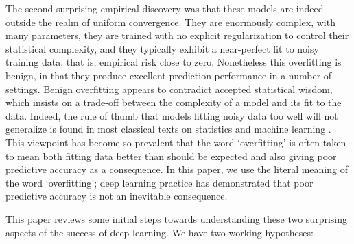 The second surprising empirical discovery was that these models are indeed outside the realm of uniform convergence. They are enormously complex, with many parameters, they are trained with no explicit regularization to control their statistical complexity, and they typically exhibit a near-perfect fit to noisy training data, that is, empirical risk close to zero. Nonetheless this overfitting is benign, in that they produce excellent prediction performance in a number of settings. Benign overfitting appears to contradict accepted statistical wisdom, which insists on a trade-off between the complexity of a model and its fit to the data. Indeed, the rule of thumb that models fitting noisy data too well will not generalize is found in most classical texts on statistics and machine learning \cite{friedman2001elements,wasserman2013all}.  This viewpoint has become so prevalent that the word `overfitting' is often taken to mean both fitting data better than should be expected and also giving poor predictive accuracy as a consequence. In this paper, we use the literal meaning of the word `overfitting'; deep learning practice has demonstrated that poor predictive accuracy is not an inevitable consequence.

This paper reviews some initial steps towards understanding these two surprising aspects of the success of deep learning. We have two working hypotheses:

